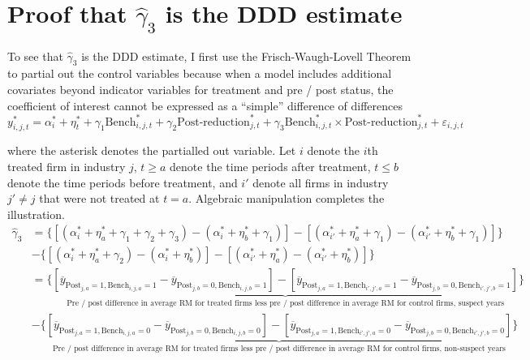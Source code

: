 \documentclass[notitlepage, 12pt]{article}
\begin{document}
\appendix\section{Proof that $\widehat{\gamma}_{3}$ is the DDD estimate}
To see that $\widehat{\gamma}_{3}$ is the DDD estimate, I first use the Frisch-Waugh-Lovell Theorem \citep{greene:2008} to partial out the control variables because when a model includes additional covariates beyond indicator variables for treatment and pre / post status, the coefficient of interest cannot be expressed as a ``simple'' difference of differences \citep{wooldridge:2010}
\[y_{i,j,t}^{*} = \alpha_{i}^{*} + \eta_{t}^{*} + \gamma_{1}\text{Bench}_{i,j,t}^{*} + \gamma_{2}\text{Post-reduction}_{j,t}^{*} + \gamma_{3}\text{Bench}_{i,j,t}^{*}\times\text{Post-reduction}_{j,t}^{*} + \varepsilon_{i,j,t}\]

\noindent where the asterisk denotes the partialled out variable. Let $i$ denote the $i$th treated firm in industry $j$, $t \ge a $ denote the time periods after treatment, $t \le b$ denote the time periods before treatment, and $i'$ denote all firms in industry $j' \ne j$ that were not treated at $t=a$. Algebraic manipulation completes the illustration.
\begin{align*}
\widehat{\gamma}_{3} &= \{[(\alpha_{i}^{*} + \eta_{a}^{*} + \gamma_{1} + \gamma_{2} + \gamma_{3}) - (\alpha_{i}^{*} + \eta_{b}^{*} + \gamma_{1})] - [(\alpha_{i'}^{*} + \eta_{a}^{*} + \gamma_{1}) - (\alpha_{i'}^{*} + \eta_{b}^{*} + \gamma_{1})]\} \\
&- \{[(\alpha_{i}^{*} + \eta_{a}^{*} + \gamma_{2}) - (\alpha_{i}^{*} + \eta_{b}^{*})] - [(\alpha_{i'}^{*} + \eta_{a}^{*}) - (\alpha_{i'}^{*} + \eta_{b}^{*})]\} \\
&= \underbrace{\{[\overline{y}_{\text{Post}_{j,a}=1, \text{Bench}_{i,j,a}=1} - \overline{y}_{\text{Post}_{j,b}=0, \text{Bench}_{i,j,b}=1}] - [\overline{y}_{\text{Post}_{j,a}=1, \text{Bench}_{i',j',a}=1} - \overline{y}_{\text{Post}_{j,b}=0, \text{Bench}_{i',j',b}=1}]\}}_{\text{Pre / post difference in average RM for treated firms less pre / post difference in average RM for control firms, suspect years}} \\
&- \underbrace{\{[\overline{y}_{\text{Post}_{j,a}=1, \text{Bench}_{i,j,a}=0} - \overline{y}_{\text{Post}_{j,b}=0, \text{Bench}_{i,j,b}=0}] - [\overline{y}_{\text{Post}_{j,a}=1, \text{Bench}_{i',j',a}=0} - \overline{y}_{\text{Post}_{j,b}=0, \text{Bench}_{i',j',b}=0}]\}}_{\text{Pre / post difference in average RM for treated firms less pre / post difference in average RM for control firms, non-suspect years}}
\end{align*}
\newpage
\end{document}
